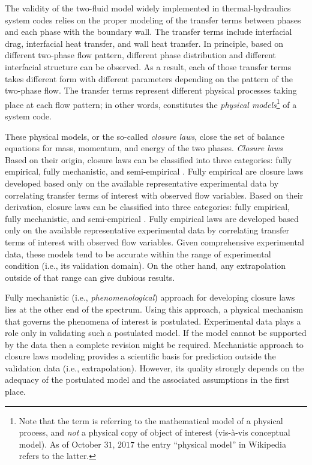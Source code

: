 The validity of the two-fluid model widely implemented in thermal-hydraulics system codes relies on the proper modeling of the transfer terms between phases and each phase with the boundary wall.
The transfer terms include interfacial drag, interfacial heat transfer, and wall heat transfer.
In principle, based on different two-phase flow pattern, different phase distribution and different interfacial structure can be observed.
As a result, each of those transfer terms takes different form with different parameters depending on the pattern of the two-phase flow.
The transfer terms represent different physical processes taking place at each flow pattern;
in other words, constitutes the \emph{physical models}\footnote{Note that the term is referring to the mathematical model of a physical process, and \emph{not} a physical copy of object of interest (vis-à-vis conceptual model). As of October $31$, $2017$ the entry ``physical model'' in Wikipedia refers to the latter.} of a system code.

These physical models, or the so-called \emph{closure laws}, close the set of balance equations for mass, momentum, and energy of the two phases.
\emph{Closure laws}
Based on their origin, closure laws can be classified into three categories: fully empirical, fully mechanistic, and semi-empirical \cite{Bestion2008}.
Fully empirical are closure laws developed based only on the available representative experimental data by correlating transfer terms of interest with observed flow variables.
Based on their derivation, closure laws can be classified into three categories: fully empirical, fully mechanistic, and semi-empirical \cite{Bestion2008}.
Fully empirical laws are developed based only on the available representative experimental data by correlating transfer terms of interest with observed flow variables.
Given comprehensive experimental data, these models tend to be accurate within the range of experimental condition (i.e., its validation domain).
On the other hand, any extrapolation outside of that range can give dubious results.

Fully mechanistic (i.e., \emph{phenomenological}) approach for developing closure laws lies at the other end of the spectrum.
Using this approach, a physical mechanism that governs the phenomena of interest is postulated.
Experimental data plays a role only in validating such a postulated model.
If the model cannot be supported by the data then a complete revision might be required.
Mechanistic approach to closure laws modeling provides a scientific basis for prediction outside the validation data (i.e., extrapolation). 
However, its quality strongly depends on the adequacy of the postulated model and the associated assumptions in the first place.

